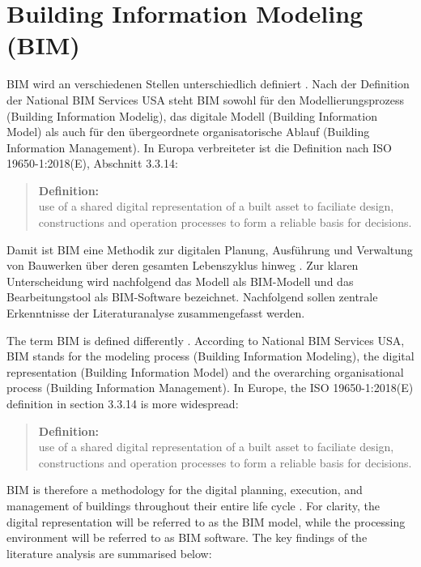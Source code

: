\section{Building Information Modeling (BIM)}
\begin{German} 
    BIM wird an verschiedenen Stellen unterschiedlich definiert \cite{astourLehrbuchGrundlagenBIMArbeitsmethode2022}. Nach der Definition der National BIM Services USA steht BIM sowohl für den Modellierungsprozess (Building Information Modelig), das digitale Modell (Building Information Model) als auch für den übergeordnete organisatorische Ablauf (Building Information Management). In Europa verbreiteter ist die Definition nach ISO 19650-1:2018(E), Abschnitt 3.3.14:

    \begin{quote}
        \textbf{Definition:}\\
        use of a shared digital representation of a built asset to faciliate design, constructions and operation processes to form a reliable basis for decisions.
    \end{quote}
        
    Damit ist BIM eine Methodik zur digitalen Planung, Ausführung und Verwaltung von Bauwerken über deren gesamten Lebenszyklus hinweg \cite{astourLehrbuchGrundlagenBIMArbeitsmethode2022}. Zur klaren Unterscheidung wird nachfolgend das Modell als BIM-Modell und das Bearbeitungstool als BIM-Software bezeichnet. Nachfolgend sollen zentrale Erkenntnisse der Literaturanalyse zusammengefasst werden.
\end{German}

\begin{English}
    The term BIM is defined differently \cite{astourLehrbuchGrundlagenBIMArbeitsmethode2022}. According to National BIM Services USA, BIM stands for the modeling process (Building Information Modeling), the digital representation (Building Information Model) and the overarching organisational process (Building Information Management). In Europe, the ISO 19650-1:2018(E) definition in section 3.3.14 is more widespread:

    \begin{quote}
        \textbf{Definition:}\\
        use of a shared digital representation of a built asset to faciliate design, constructions and operation processes to form a reliable basis for decisions.
    \end{quote}

    BIM is therefore a methodology for the digital planning, execution, and management of buildings throughout their entire life cycle \cite{astourLehrbuchGrundlagenBIMArbeitsmethode2022}. For clarity, the digital representation will be referred to as the BIM model, while the processing environment will be referred to as BIM software. The key findings of the literature analysis are summarised below:
\end{English}

